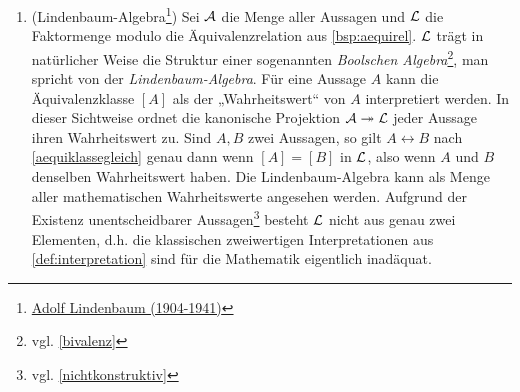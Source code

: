 \begin{bsp}[*]
\begin{enumerate}
        \item(Lindenbaum-Algebra\footnote{\href{https://de.wikipedia.org/wiki/Adolf_Lindenbaum}{Adolf Lindenbaum (1904-1941)}}) Sei $\mathcal A$ die Menge aller Aussagen und $\mathcal L$ die Faktormenge modulo die Äquivalenzrelation aus \cref{bsp:aequirel}. $\mathcal L$ trägt in natürlicher Weise die Struktur einer sogenannten \emph{Boolschen Algebra}\footnote{vgl. \cref{bivalenz}}, man spricht von der \emph{Lindenbaum-Algebra}. Für eine Aussage $A$ kann die Äquivalenzklasse $[A]$ als der „Wahrheitswert“ von $A$ interpretiert werden. In dieser Sichtweise ordnet die kanonische Projektion $\mathcal A\twoheadrightarrow \mathcal L$ jeder Aussage ihren Wahrheitswert zu. Sind $A,B$ zwei Aussagen, so gilt $A\leftrightarrow B$ nach \cref{aequiklassegleich} genau dann wenn $[A]=[B]$ in $\mathcal L$, also wenn $A$ und $B$ denselben Wahrheitswert haben. Die Lindenbaum-Algebra kann als Menge aller mathematischen Wahrheitswerte angesehen werden. Aufgrund der Existenz unentscheidbarer Aussagen\footnote{vgl. \cref{nichtkonstruktiv}} besteht $\mathcal L$ nicht aus genau zwei Elementen, d.h. die klassischen zweiwertigen Interpretationen aus \cref{def:interpretation} sind für die Mathematik eigentlich inadäquat.
    \end{enumerate}
\end{bsp}


